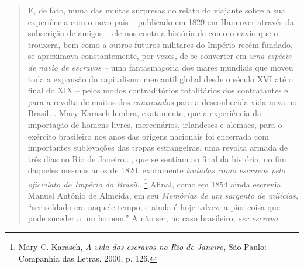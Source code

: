 \begin{quote}
E, de fato, numa das muitas surpresas do relato do viajante sobre a sua
experiência com o novo país -- publicado em 1829 em Hannover através da
subscrição de amigos -- ele nos conta a história de como o navio que o
trouxera, bem como a outros futuros militares do Império recém fundado,
se aproximava constantemente, por vezes, de se converter em \emph{uma}
\emph{espécie} \emph{de} \emph{navio de escravos --} uma fantasmagoria
dos mares mundiais que moveu toda a expansão do capitalismo mercantil
global desde o século XVI até o final do XIX -- pelos modos
contraditórios totalitários dos contratantes e para a revolta de muitos
dos \emph{contratados} para a desconhecida vida nova no Brasil\emph{...}
Mary Karasch lembra, exatamente, que a experiência da importação de
homens livres, mercenários, irlandeses e alemães, para o exército
brasileiro nos anos das origens nacionais foi encerrada com importantes
sublevações das tropas estrangeiras, uma revolta armada de três dias no
Rio de Janeiro..., que se sentiam ao final da história, no fim daqueles
mesmos anos de 1820, exatamente \emph{tratadas como escravos pelo
oficialato do Império do Brasil}...\footnote{Mary C. Karasch, \emph{A
  vida dos escravos no Rio de Janeiro}, São Paulo: Companhia das Letras,
  2000, p. 126.} Afinal, como em 1854 ainda escrevia Manuel Antônio de
Almeida, em seu \emph{Memórias de um sargento de milícias}, ``ser
soldado era naquele tempo, e ainda é hoje talvez, a pior coisa que pode
suceder a um homem.'' A não ser, no caso brasileiro, \emph{ser escravo.}


\end{quote}
